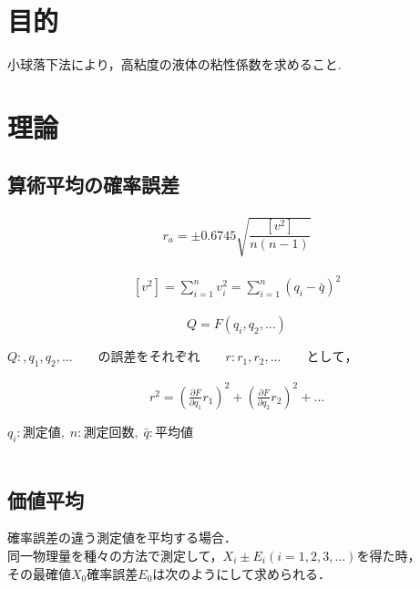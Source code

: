 \documentclass[a4paper,1pt]{jsarticle}
\begin{document}
\section{目的}
小球落下法により，高粘度の液体の粘性係数を求めること.\\




\section{理論}

 \subsection*{算術平均の確率誤差}

 \begin{eqnarray}
  \label{kakuritugosa}
  r_a=\pm0.6745\sqrt{\dfrac{[v^2]}{n(n-1)}}
\end{eqnarray}

\begin{eqnarray}
  \label{kaisekizansa}
  [v^2]=\sum_{i=1}^n v_i^2=\sum_{i=1}^n(q_i-\bar{q})^2
\end{eqnarray}

\begin{eqnarray}
  \label{kaisekizansa}
  Q=F(q_i,q_2,...)
\end{eqnarray}


  $Q:,q_1,q_2,\dots\qquad の誤差をそれぞれ\qquad r:r_1,r_2,...\qquad として，$

  \begin{eqnarray}
    \label{kaisekizansa}
    r^2=\left(\frac{\partial F}{\partial q_1}r_1\right)^2+\left(\frac{\partial F}{\partial q_2}r_2\right)^2+\dots
  \end{eqnarray}


  


  $q_i:測定値,\; n:測定回数,\; \bar{q}:平均値$\\\\



  \subsection*{価値平均}
  確率誤差の違う測定値を平均する場合．\\
  同一物理量を種々の方法で測定して，$X_i \pm E_i (i=1,2,3, \dots)$を得た時，\\
  その最確値$X_0$確率誤差$E_0$は次のようにして求められる．\\
\end{document}
